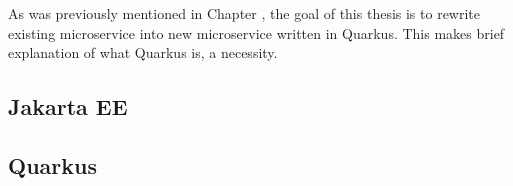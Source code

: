 \documentclass[../main.tex]{subfiles}
\begin{document}
As was previously mentioned in Chapter , the goal of this thesis is to rewrite existing microservice into new microservice written in Quarkus. This makes brief explanation of what Quarkus is, a necessity.

\subsection*{Jakarta EE}


\subsection*{Quarkus}

\end{document}
